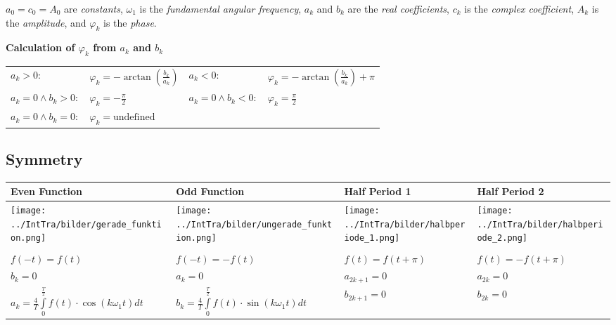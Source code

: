 	$a_0=c_0=A_0$ are \textit{constants}, $\omega_1$ is the
    \textit{fundamental angular frequency}, $a_k$ and $b_k$ are the \textit{real
    coefficients}, $c_k$ is the \textit{complex coefficient}, $A_k$ is the
    \textit{amplitude}, and $\varphi_k$ is the \textit{phase}.\\

	\textbf{Calculation of $\varphi_k$ from $a_k$ and $b_k$}\\
    \begin{tabular}{p{4cm}p{4cm}p{3cm}p{3.5cm}}
        $a_k> 0:$ & $\varphi_k = -\arctan(\frac{b_k}{a_k})$ &
        $a_k<0:$ &    $\varphi_k = -\arctan(\frac{b_k}{a_k}) + \pi$\\
        $a_k = 0 \wedge b_k > 0:$ &    $\varphi_k = -\frac{\pi}{2}$ &
        $a_k = 0 \wedge b_k < 0:$ &    $\varphi_k = \frac{\pi}{2}$\\
        $a_k = 0 \wedge b_k = 0:$ &    $\varphi_k = \text{undefined}$
    \end{tabular}

	\subsection{Symmetry}
        \begin{tabular}{|p{4.3cm}|p{4.3cm}|p{4.4cm}|p{4.4cm}|}
            \hline
            \textbf{Even Function} & \textbf{Odd Function} &
            \textbf{Half Period 1} & \textbf{Half Period 2}\\
            \hline
            \texttt{[image: ../IntTra/bilder/gerade\_funktion.png]}&
            \texttt{[image: ../IntTra/bilder/ungerade\_funktion.png]}&   
            \texttt{[image: ../IntTra/bilder/halbperiode\_1.png]}&   
            \texttt{[image: ../IntTra/bilder/halbperiode\_2.png]}\\
            \hline & & & \\            
            $f(-t)=f(t)$ & $f(-t)=-f(t)$ & $f(t)=f(t+\pi)$ & $f(t)=-f(t+\pi)$\\
            $b_k=0$ & $a_k=0$ & $a_{2k+1}=0$ & $a_{2k}=0$\\
            $a_k = \frac{4}{T} \int\limits_0^{\frac{T}{2}} f(t) \cdot \cos(k \omega_1
            t) dt$ &
            $b_k =  \frac{4}{T} \int\limits_0^{\frac{T}{2}} f(t) \cdot
            \sin(k \omega_1 t) dt$ &
            $b_{2k+1}=0$ & $b_{2k}=0$\\
            \hline
        \end{tabular}

